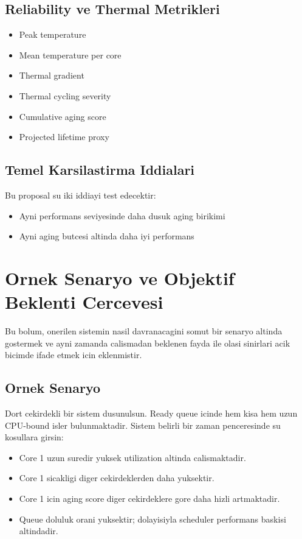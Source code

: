 \documentclass[12pt,a4paper]{article}
\begin{document}
\subsection{Reliability ve Thermal Metrikleri}

\begin{itemize}[leftmargin=*]
\item Peak temperature
\item Mean temperature per core
\item Thermal gradient
\item Thermal cycling severity
\item Cumulative aging score
\item Projected lifetime proxy
\end{itemize}

\subsection{Temel Karsilastirma Iddialari}

Bu proposal su iki iddiayi test edecektir:

\begin{itemize}[leftmargin=*]
\item Ayni performans seviyesinde daha dusuk aging birikimi
\item Ayni aging butcesi altinda daha iyi performans
\end{itemize}

\section{Ornek Senaryo ve Objektif Beklenti Cercevesi}

Bu bolum, onerilen sistemin nasil davranacagini somut bir senaryo altinda gostermek ve ayni zamanda
calismadan beklenen fayda ile olasi sinirlari acik bicimde ifade etmek icin eklenmistir.

\subsection{Ornek Senaryo}

Dort cekirdekli bir sistem dusunulsun. Ready queue icinde hem kisa hem uzun CPU-bound isler bulunmaktadir.
Sistem belirli bir zaman penceresinde su kosullara girsin:

\begin{itemize}[leftmargin=*]
\item Core 1 uzun suredir yuksek utilization altinda calismaktadir.
\item Core 1 sicakligi diger cekirdeklerden daha yuksektir.
\item Core 1 icin aging score diger cekirdeklere gore daha hizli artmaktadir.
\item Queue doluluk orani yuksektir; dolayisiyla scheduler performans baskisi altindadir.
\end{itemize}
\end{document}
